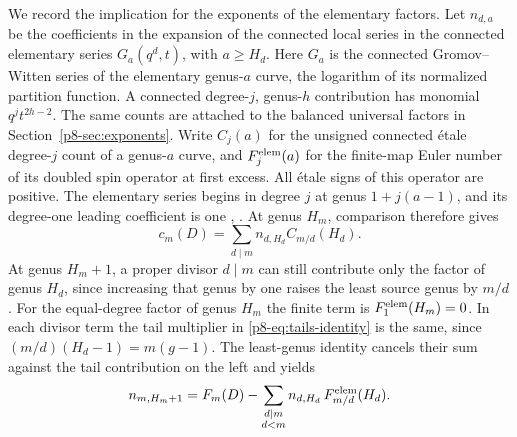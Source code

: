 We record the implication for the exponents of the elementary
factors. Let \(n_{d,a}\) be the coefficients in the expansion of
the connected local series in the connected elementary series
\(G_a(q^d,t)\), with \(a\ge H_d\). Here $G_a$ is the
connected Gromov--Witten series of the elementary genus-$a$ curve,
the logarithm of its normalized partition function. A connected
degree-$j$, genus-$h$ contribution has monomial $q^jt^{2h-2}$.
The same counts are attached to the balanced universal factors
in Section~\ref{p8-sec:exponents}. Write \(C_j(a)\) for the
unsigned connected \'etale degree-\(j\) count of a genus-\(a\)
curve, and \(F_j^{\rm elem}(a)\) for the finite-map Euler number of
its doubled spin operator at first excess. All \'etale signs of this
operator are positive. The elementary series begins in degree \(j\)
at genus \(1+j(a-1)\), and its degree-one leading coefficient is one
\cite[Propositions~3.2--3.3]{ip}, \cite[Proposition~3.46]{diw}. At genus
\(H_m\), comparison therefore gives
\[
               c_m(D)=\sum_{d\mid m} n_{d,H_d} C_{m/d}(H_d).
\]
At genus \(H_m+1\), a proper divisor \(d\mid m\) can still contribute
only the factor of genus \(H_d\), since increasing that genus by one
raises the least source genus by \(m/d\). For the equal-degree
factor of genus \(H_m\) the finite term is \(F_1^{\rm elem}(H_m)=0\).
In each divisor term the tail multiplier in
\eqref{p8-eq:tails-identity} is the same, since
\((m/d)(H_d-1)=m(g-1)\). The least-genus identity cancels their sum
against the tail contribution on the left and yields
\begin{equation}\label{p8-eq:tails-exponent}
          n_{m,H_m+1}=F_m(D)-
          \sum_{\substack{d\mid m\\d<m}}
                   n_{d,H_d}\,F_{m/d}^{\rm elem}(H_d).
\end{equation}
